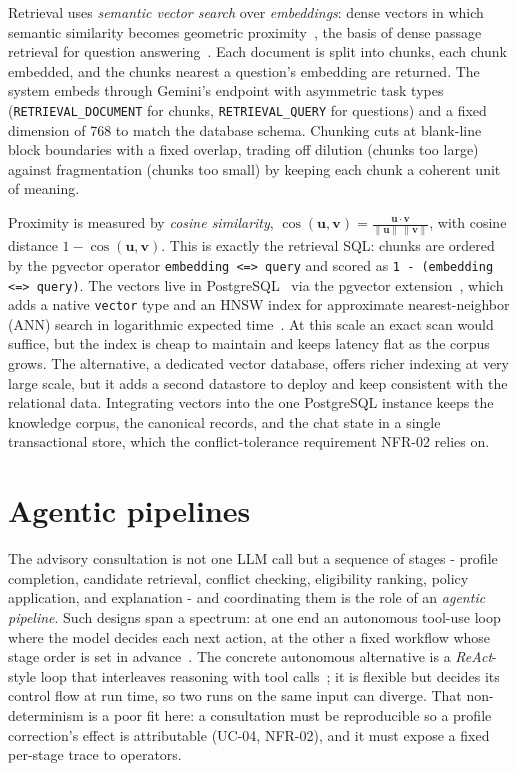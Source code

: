 \documentclass[../main.tex]{subfiles}
\begin{document}
Retrieval uses \textit{semantic vector search} over \textit{embeddings}: dense vectors in which semantic similarity becomes geometric proximity~\cite{reimers2019sbert}, the basis of dense passage retrieval for question answering~\cite{karpukhin2020dpr}.
Each document is split into chunks, each chunk embedded, and the chunks nearest a question's embedding are returned.
The system embeds through Gemini's endpoint with asymmetric task types (\texttt{RETRIEVAL\_DOCUMENT} for chunks, \texttt{RETRIEVAL\_QUERY} for questions) and a fixed dimension of 768 to match the database schema.
Chunking cuts at blank-line block boundaries with a fixed overlap, trading off dilution (chunks too large) against fragmentation (chunks too small) by keeping each chunk a coherent unit of meaning.

Proximity is measured by \textit{cosine similarity}, $\cos(\mathbf{u},\mathbf{v}) = \frac{\mathbf{u}\cdot\mathbf{v}}{\lVert\mathbf{u}\rVert\,\lVert\mathbf{v}\rVert}$, with cosine distance $1-\cos(\mathbf{u},\mathbf{v})$.
This is exactly the retrieval \gls{SQL}: chunks are ordered by the pgvector operator \texttt{embedding <=> query} and scored as \texttt{1 - (embedding <=> query)}.
The vectors live in PostgreSQL~\cite{postgresql} via the pgvector extension~\cite{pgvector}, which adds a native \texttt{vector} type and an \gls{HNSW} index for approximate nearest-neighbor (\gls{ANN}) search in logarithmic expected time~\cite{malkov2020hnsw}.
At this scale an exact scan would suffice, but the index is cheap to maintain and keeps latency flat as the corpus grows.
The alternative, a dedicated vector database, offers richer indexing at very large scale, but it adds a second datastore to deploy and keep consistent with the relational data.
Integrating vectors into the one PostgreSQL instance keeps the knowledge corpus, the canonical records, and the chat state in a single transactional store, which the conflict-tolerance requirement NFR-02 relies on.

\section{Agentic pipelines}
\label{section:3.3}

The advisory consultation is not one \gls{LLM} call but a sequence of stages - profile completion, candidate retrieval, conflict checking, eligibility ranking, policy application, and explanation - and coordinating them is the role of an \textit{agentic pipeline}.
Such designs span a spectrum: at one end an autonomous tool-use loop where the model decides each next action, at the other a fixed workflow whose stage order is set in advance~\cite{wang2024agentsurvey}.
The concrete autonomous alternative is a \textit{ReAct}-style loop that interleaves reasoning with tool calls~\cite{yao2023react}; it is flexible but decides its control flow at run time, so two runs on the same input can diverge.
That non-determinism is a poor fit here: a consultation must be reproducible so a profile correction's effect is attributable (UC-04, NFR-02), and it must expose a fixed per-stage trace to operators.
\end{document}
